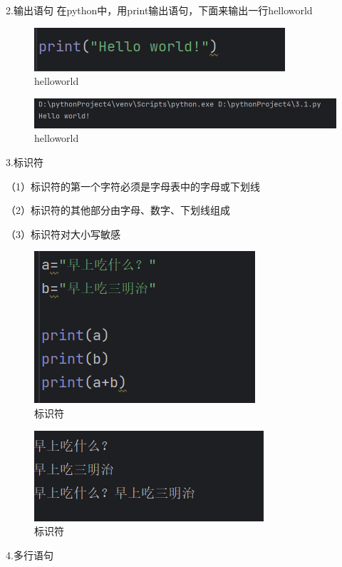 \documentclass{ctexart}
\begin{document}
	2.输出语句
	在python中，用print输出语句，下面来输出一行helloworld
	\begin{figure}[H]
		\centering
		\includegraphics{3.3}
		\caption{helloworld}
	\end{figure}
	
	\begin{figure}[H]
		\centering
		\includegraphics{3.4}
		\caption{helloworld}
	\end{figure}
	
	3.标识符
	
	（1）标识符的第一个字符必须是字母表中的字母或下划线
	
	（2）标识符的其他部分由字母、数字、下划线组成
	
	（3）标识符对大小写敏感
	
	
	\begin{figure}[H]
		\centering
		\includegraphics{3.5}
		\caption{标识符}
	\end{figure}
	
	
	\begin{figure}[H]
		\centering
		\includegraphics{3.6}
		\caption{标识符}
	\end{figure}
	
	4.多行语句
	
\end{document}
